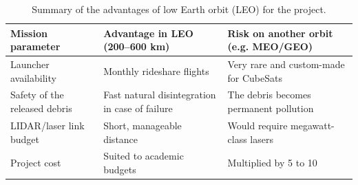 \documentclass[11pt,a4paper]{article}
\begin{document}
\begin{table}[H]
  \centering
  \small
  \caption{Summary of the advantages of low Earth orbit (LEO) for the project.}
  \label{tab:leo}
  \begin{tabular}{p{3.5cm} p{5.5cm} p{5.5cm}}
    \toprule
    \textbf{Mission parameter} & \textbf{Advantage in LEO (200--600 km)} & \textbf{Risk on another orbit (e.g. MEO/GEO)} \\
    \midrule
    Launcher availability & Monthly rideshare flights & Very rare and custom-made for CubeSats \\
    Safety of the released debris & Fast natural disintegration in case of failure & The debris becomes permanent pollution \\
    LIDAR/laser link budget & Short, manageable distance & Would require megawatt-class lasers \\
    Project cost & Suited to academic budgets & Multiplied by 5 to 10 \\
    \bottomrule
  \end{tabular}
\end{table}
\end{document}
